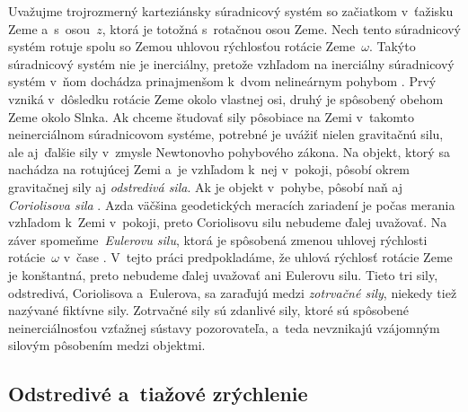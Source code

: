 \documentclass[a4paper, 12pt]{book}
\begin{document}
Uvažujme trojrozmerný karteziánsky súradnicový systém so začiatkom v~ťažisku 
Zeme a~s~osou~$z$, ktorá je totožná s~rotačnou osou Zeme.  Nech tento 
súradnicový systém rotuje spolu so Zemou uhlovou rýchlosťou rotácie 
Zeme~$\omega$.  Takýto súradnicový systém nie je inerciálny, pretože vzhľadom 
na inerciálny súradnicový systém v~ňom dochádza prinajmenšom k~dvom nelineárnym 
pohybom \parencite{SansoGeoidDetermination}.  Prvý vzniká v~dôsledku rotácie 
Zeme okolo vlastnej osi, druhý je spôsobený obehom Zeme okolo Slnka.  Ak chceme 
študovať sily pôsobiace na Zemi v~takomto neinerciálnom súradnicovom systéme, 
potrebné je uvážiť nielen gravitačnú silu, ale aj~ďalšie sily v~zmysle 
Newtonovho pohybového zákona.  Na objekt, ktorý sa nachádza na rotujúcej Zemi 
a~je vzhľadom k~nej v~pokoji, pôsobí okrem gravitačnej sily aj \emph{odstredivá 
sila}.  Ak je objekt v~pohybe, pôsobí naň aj \emph{Coriolisova sila} 
\parencite{Torge1989,Jekeli2000,SansoGeoidDetermination}.  Azda väčšina 
geodetických meracích zariadení je počas merania vzhľadom k~Zemi v~pokoji, 
preto Coriolisovu silu nebudeme ďalej uvažovať.  Na záver 
spomeňme~\emph{Eulerovu silu}, ktorá je spôsobená zmenou uhlovej rýchlosti 
rotácie~$\omega$ v~čase \parencite{Torge1989,SansoGeoidDetermination}.  V~tejto 
práci predpokladáme, že uhlová rýchlosť rotácie Zeme je konštantná, preto 
nebudeme ďalej uvažovať ani Eulerovu silu.  Tieto tri sily, odstredivá, 
Coriolisova a~Eulerova, sa zaraďujú medzi \emph{zotrvačné sily}, niekedy tiež 
nazývané fiktívne sily.  Zotrvačné sily sú zdanlivé sily, ktoré sú spôsobené 
neinerciálnosťou vzťažnej sústavy pozorovateľa, a~teda nevznikajú vzájomným 
silovým pôsobením medzi objektmi.






\subsection{Odstredivé a~tiažové zrýchlenie}
\label{sec:centrifugal_and_gravity_acceleration}
\end{document}
